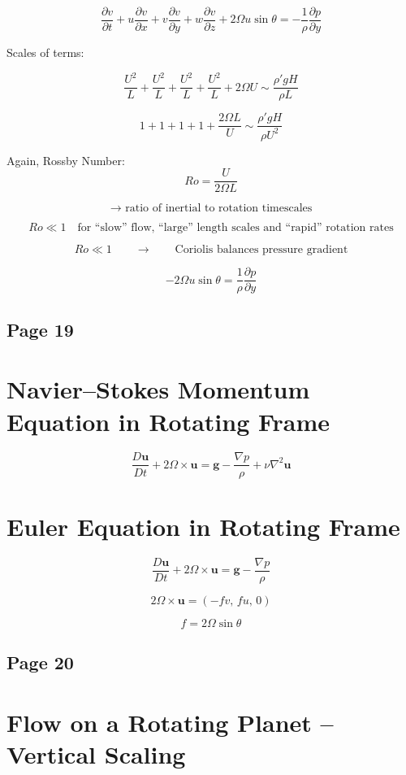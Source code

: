 \documentclass[11pt]{article}
\begin{document}
\[
\frac{\partial v}{\partial t}
+u\frac{\partial v}{\partial x}
+v\frac{\partial v}{\partial y}
+w\frac{\partial v}{\partial z}
+2\Omega u\sin\theta
=
-\frac{1}{\rho}\frac{\partial p}{\partial y}
\]

Scales of terms:

\[
\frac{U^2}{L}
+\frac{U^2}{L}
+\frac{U^2}{L}
+\frac{U^2}{L}
+2\Omega U
\sim
\frac{\rho' g H}{\rho L}
\]

\[
1+1+1+1+\frac{2\Omega L}{U}
\sim
\frac{\rho' g H}{\rho U^2}
\]

Again, Rossby Number:
\[
Ro=\frac{U}{2\Omega L}
\]

\[
\to \text{ ratio of inertial to rotation timescales}
\]

\[
Ro \ll 1
\quad
\text{for ``slow'' flow, ``large'' length scales and ``rapid'' rotation rates}
\]

\[
Ro \ll 1
\qquad\to\qquad
\text{Coriolis balances pressure gradient}
\]

\[
-2\Omega u\sin\theta
=
\frac{1}{\rho}\frac{\partial p}{\partial y}
\]

\subsection*{Page 19}
\section*{Navier--Stokes Momentum Equation in Rotating Frame}

\[
\frac{D\mathbf{u}}{Dt}
+2\Omega\times\mathbf{u}
=
\mathbf{g}
-\frac{\nabla p}{\rho}
+\nu\nabla^2\mathbf{u}
\]

\section*{Euler Equation in Rotating Frame}

\[
\frac{D\mathbf{u}}{Dt}
+2\Omega\times\mathbf{u}
=
\mathbf{g}
-\frac{\nabla p}{\rho}
\]

\[
2\Omega\times\mathbf{u}
=
(-fv,\,fu,\,0)
\]

\[
f=2\Omega\sin\theta
\]

\subsection*{Page 20}
\section*{Flow on a Rotating Planet -- Vertical Scaling}
\end{document}
